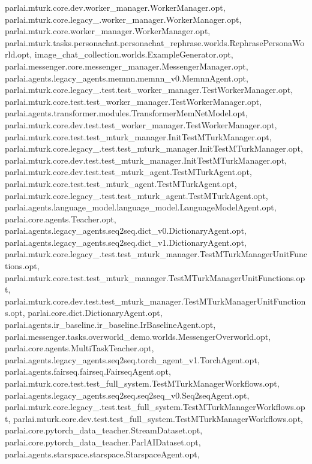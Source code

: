 parlai.\+mturk.\+core.\+dev.\+worker\+\_\+manager.\+Worker\+Manager.\+opt, parlai.\+mturk.\+core.\+legacy\+\_.\+worker\+\_\+manager.\+Worker\+Manager.\+opt, parlai.\+mturk.\+core.\+worker\+\_\+manager.\+Worker\+Manager.\+opt, parlai.\+mturk.\+tasks.\+personachat.\+personachat\+\_\+rephrase.\+worlds.\+Rephrase\+Persona\+World.\+opt, image\+\_\+chat\+\_\+collection.\+worlds.\+Example\+Generator.\+opt, parlai.\+messenger.\+core.\+messenger\+\_\+manager.\+Messenger\+Manager.\+opt, parlai.\+agents.\+legacy\+\_\+agents.\+memnn.\+memnn\+\_\+v0.\+Memnn\+Agent.\+opt, parlai.\+mturk.\+core.\+legacy\+\_.\+test.\+test\+\_\+worker\+\_\+manager.\+Test\+Worker\+Manager.\+opt, parlai.\+mturk.\+core.\+test.\+test\+\_\+worker\+\_\+manager.\+Test\+Worker\+Manager.\+opt, parlai.\+agents.\+transformer.\+modules.\+Transformer\+Mem\+Net\+Model.\+opt, parlai.\+mturk.\+core.\+dev.\+test.\+test\+\_\+worker\+\_\+manager.\+Test\+Worker\+Manager.\+opt, parlai.\+mturk.\+core.\+test.\+test\+\_\+mturk\+\_\+manager.\+Init\+Test\+M\+Turk\+Manager.\+opt, parlai.\+mturk.\+core.\+legacy\+\_.\+test.\+test\+\_\+mturk\+\_\+manager.\+Init\+Test\+M\+Turk\+Manager.\+opt, parlai.\+mturk.\+core.\+dev.\+test.\+test\+\_\+mturk\+\_\+manager.\+Init\+Test\+M\+Turk\+Manager.\+opt, parlai.\+mturk.\+core.\+dev.\+test.\+test\+\_\+mturk\+\_\+agent.\+Test\+M\+Turk\+Agent.\+opt, parlai.\+mturk.\+core.\+test.\+test\+\_\+mturk\+\_\+agent.\+Test\+M\+Turk\+Agent.\+opt, parlai.\+mturk.\+core.\+legacy\+\_.\+test.\+test\+\_\+mturk\+\_\+agent.\+Test\+M\+Turk\+Agent.\+opt, parlai.\+agents.\+language\+\_\+model.\+language\+\_\+model.\+Language\+Model\+Agent.\+opt, parlai.\+core.\+agents.\+Teacher.\+opt, parlai.\+agents.\+legacy\+\_\+agents.\+seq2seq.\+dict\+\_\+v0.\+Dictionary\+Agent.\+opt, parlai.\+agents.\+legacy\+\_\+agents.\+seq2seq.\+dict\+\_\+v1.\+Dictionary\+Agent.\+opt, parlai.\+mturk.\+core.\+legacy\+\_.\+test.\+test\+\_\+mturk\+\_\+manager.\+Test\+M\+Turk\+Manager\+Unit\+Functions.\+opt, parlai.\+mturk.\+core.\+test.\+test\+\_\+mturk\+\_\+manager.\+Test\+M\+Turk\+Manager\+Unit\+Functions.\+opt, parlai.\+mturk.\+core.\+dev.\+test.\+test\+\_\+mturk\+\_\+manager.\+Test\+M\+Turk\+Manager\+Unit\+Functions.\+opt, parlai.\+core.\+dict.\+Dictionary\+Agent.\+opt, parlai.\+agents.\+ir\+\_\+baseline.\+ir\+\_\+baseline.\+Ir\+Baseline\+Agent.\+opt, parlai.\+messenger.\+tasks.\+overworld\+\_\+demo.\+worlds.\+Messenger\+Overworld.\+opt, parlai.\+core.\+agents.\+Multi\+Task\+Teacher.\+opt, parlai.\+agents.\+legacy\+\_\+agents.\+seq2seq.\+torch\+\_\+agent\+\_\+v1.\+Torch\+Agent.\+opt, parlai.\+agents.\+fairseq.\+fairseq.\+Fairseq\+Agent.\+opt, parlai.\+mturk.\+core.\+test.\+test\+\_\+full\+\_\+system.\+Test\+M\+Turk\+Manager\+Workflows.\+opt, parlai.\+agents.\+legacy\+\_\+agents.\+seq2seq.\+seq2seq\+\_\+v0.\+Seq2seq\+Agent.\+opt, parlai.\+mturk.\+core.\+legacy\+\_.\+test.\+test\+\_\+full\+\_\+system.\+Test\+M\+Turk\+Manager\+Workflows.\+opt, parlai.\+mturk.\+core.\+dev.\+test.\+test\+\_\+full\+\_\+system.\+Test\+M\+Turk\+Manager\+Workflows.\+opt, parlai.\+core.\+pytorch\+\_\+data\+\_\+teacher.\+Stream\+Dataset.\+opt, parlai.\+core.\+pytorch\+\_\+data\+\_\+teacher.\+Parl\+A\+I\+Dataset.\+opt, parlai.\+agents.\+starspace.\+starspace.\+Starspace\+Agent.\+opt, 